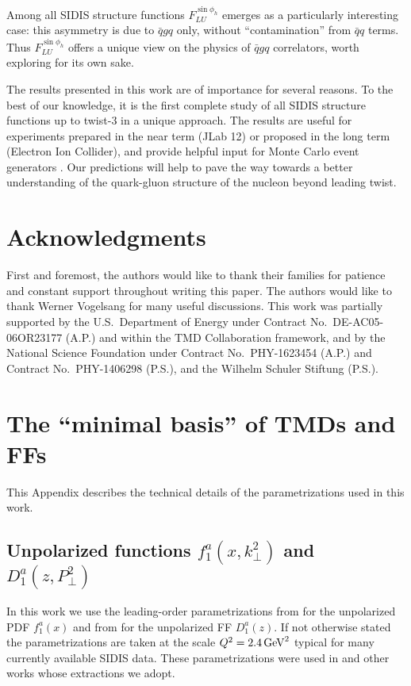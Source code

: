 \documentclass[a4paper,11pt]{article}
\begin{document}
Among all SIDIS structure functions $F_{LU}^{\sin\phi_h}$ emerges as
a particularly interesting case: this asymmetry is due to $\bar{q}gq$
only, without ``contamination'' from $\bar{q}q$ terms.
Thus $F_{LU}^{\sin\phi_h}$ offers a unique view on the physics of $\bar{q}gq$
correlators, worth exploring for its own sake.

The results presented in this work are of importance for several reasons.
To the best of our knowledge, it is the first complete study of all SIDIS
structure functions up to twist-3 in a unique approach. The results are
useful for experiments prepared in the near term (JLab 12) or proposed
in the long term (Electron Ion Collider), and provide helpful input for
Monte Carlo event generators \cite{Avakian:2015vha}.
Our predictions will help to pave the way
towards a better understanding of the quark-gluon structure
of the nucleon beyond leading twist.



\section{Acknowledgments}
First and foremost, the authors would like to thank their families
for patience and constant support throughout writing this paper.
The authors would like to thank Werner Vogelsang for many useful
discussions. This work was partially supported by the U.S.\
Department of Energy under Contract No.~DE-AC05-06OR23177 (A.P.)
and within the TMD Collaboration framework, and by the National
Science Foundation under Contract No.\ PHY-1623454 (A.P.) and
Contract No.\ PHY-1406298 (P.S.), and the Wilhelm Schuler Stiftung (P.S.).




\appendix

\section{\boldmath The ``minimal basis'' of TMDs and FFs}
\label{App:basis}

This Appendix describes the technical details of the parametrizations
used in this work.

\subsection{\boldmath Unpolarized functions $f_1^a(x,k_\perp^2)$
			and $D_1^a(z,P_\perp^2)$}
\label{App:basis-f1-D1}

In this work we use the leading-order parametrizations
from \cite{Martin:2009iq} for the unpolarized PDF $f_1^a(x)$ and
from \cite{deFlorian:2007aj} for the unpolarized FF $D_1^a(z)$.
If not otherwise stated the parametrizations are taken at the scale
$Q^2=2.4\,{\rm GeV}^2$ typical for many currently available SIDIS data.
These parametrizations were used in \cite{Anselmino:2005nn} and other
works whose extractions we adopt.
\end{document}
